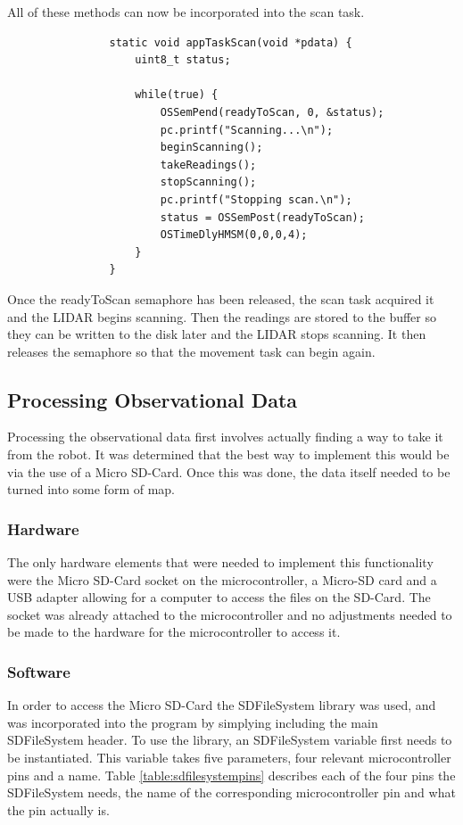 				All of these methods can now be incorporated into the scan task.
				\begin{lstlisting}
				static void appTaskScan(void *pdata) {
					uint8_t status;
				
					while(true) {
						OSSemPend(readyToScan, 0, &status);
						pc.printf("Scanning...\n");
						beginScanning();
						takeReadings();
						stopScanning();
						pc.printf("Stopping scan.\n");
						status = OSSemPost(readyToScan);
						OSTimeDlyHMSM(0,0,0,4);
					}
				}
				\end{lstlisting}
				Once the readyToScan semaphore has been released, the scan task acquired it and the LIDAR begins scanning. Then the readings are stored to the buffer so they can be written to the disk later and the LIDAR stops scanning. It then releases the semaphore so that the movement task can begin again.		
				
			\subsection{Processing Observational Data}
			Processing the observational data first involves actually finding a way to take it from the robot. It was determined that the best way to implement this would be via the use of a Micro SD-Card. Once this was done, the data itself needed to be turned into some form of map.
			
				\subsubsection{Hardware}
				The only hardware elements that were needed to implement this functionality were the Micro SD-Card socket on the microcontroller, a Micro-SD card and a USB adapter allowing for a computer to access the files on the SD-Card. The socket was already attached to the microcontroller and no adjustments needed to be made to the hardware for the microcontroller to access it.
				
				\subsubsection{Software}
				In order to access the Micro SD-Card the SDFileSystem library was used, and was incorporated into the program by simplying including the main SDFileSystem header. To use the library, an SDFileSystem variable first needs to be instantiated. This variable takes five parameters, four relevant microcontroller pins and a name. Table \ref{table:sdfilesystempins} describes each of the four pins the SDFileSystem needs, the name of the corresponding microcontroller pin and what the pin actually is.
	
